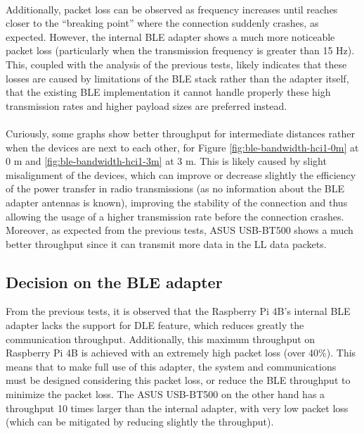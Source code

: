 \paragraph{} Additionally, packet loss can be observed as frequency increases until reaches closer to the ``breaking point'' where the connection suddenly crashes, as expected. However, the internal \acs{BLE} adapter shows a much more noticeable packet loss (particularly when the transmission frequency is greater than 15 Hz). This, coupled with the analysis of the previous tests, likely indicates that these losses are caused by limitations of the \acs{BLE} stack rather than the adapter itself, that the existing \acs*{BLE} implementation it cannot handle properly these high transmission rates and higher payload sizes are preferred instead. 

\paragraph{} Curiously, some graphs show better throughput for intermediate distances rather when the devices are next to each other,  for Figure \ref{fig:ble-bandwidth-hci1-0m} at 0 m and \ref{fig:ble-bandwidth-hci1-3m} at 3 m. This is likely caused by slight misalignment of the devices, which can improve or decrease slightly the efficiency of the power transfer in radio transmissions (as no information about the \acs{BLE} adapter antennas is known), improving the stability of the connection and thus allowing the usage of a higher transmission rate before the connection crashes. Moreover, as expected from the previous tests, ASUS USB-BT500 shows a much better throughput since it can transmit more data in the \acs{LL} data packets. 

\subsection{Decision on the \acs{BLE} adapter}

From the previous tests, it is observed that the Raspberry Pi 4B's internal \acs{BLE} adapter lacks the support for \acs{DLE} feature, which reduces greatly the communication throughput. Additionally, this maximum throughput on Raspberry Pi 4B is achieved with an extremely high packet loss (over 40\%). This means that to make full use of this adapter, the system and communications must be designed considering this packet loss, or reduce the \acs{BLE} throughput to minimize the packet loss. The ASUS USB-BT500 on the other hand has a throughput 10 times larger than the internal adapter, with very low packet loss (which can be mitigated by reducing slightly the throughput).

